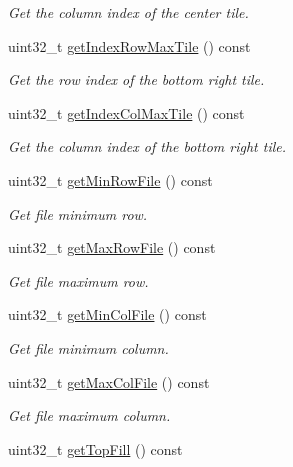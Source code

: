 \begin{DoxyCompactItemize}
\begin{DoxyCompactList}\small\item\em Get the column index of the center tile. \end{DoxyCompactList}\item 
uint32\+\_\+t \hyperlink{classfi_1_1HTGSViewRequestData_ad852d2cc5fdc92b39474277efd8d601e}{get\+Index\+Row\+Max\+Tile} () const
\begin{DoxyCompactList}\small\item\em Get the row index of the bottom right tile. \end{DoxyCompactList}\item 
uint32\+\_\+t \hyperlink{classfi_1_1HTGSViewRequestData_a6185ba2ac51f76c3bf447c08c0c4c63f}{get\+Index\+Col\+Max\+Tile} () const
\begin{DoxyCompactList}\small\item\em Get the column index of the bottom right tile. \end{DoxyCompactList}\item 
uint32\+\_\+t \hyperlink{classfi_1_1HTGSViewRequestData_a309a84d7eb8509b784124d74b9c986cd}{get\+Min\+Row\+File} () const
\begin{DoxyCompactList}\small\item\em Get file minimum row. \end{DoxyCompactList}\item 
uint32\+\_\+t \hyperlink{classfi_1_1HTGSViewRequestData_a2cfede2b1ca5e1f9dcbae4f8a66a46f8}{get\+Max\+Row\+File} () const
\begin{DoxyCompactList}\small\item\em Get file maximum row. \end{DoxyCompactList}\item 
uint32\+\_\+t \hyperlink{classfi_1_1HTGSViewRequestData_a363dec233a9e85a3271e365f891028ce}{get\+Min\+Col\+File} () const
\begin{DoxyCompactList}\small\item\em Get file minimum column. \end{DoxyCompactList}\item 
uint32\+\_\+t \hyperlink{classfi_1_1HTGSViewRequestData_a1a86afeba8d7325e353557394842fd7f}{get\+Max\+Col\+File} () const
\begin{DoxyCompactList}\small\item\em Get file maximum column. \end{DoxyCompactList}\item 
uint32\+\_\+t \hyperlink{classfi_1_1HTGSViewRequestData_a7e332cee8cff6b280063ef21f47a3ee5}{get\+Top\+Fill} () const

\end{DoxyCompactItemize}
